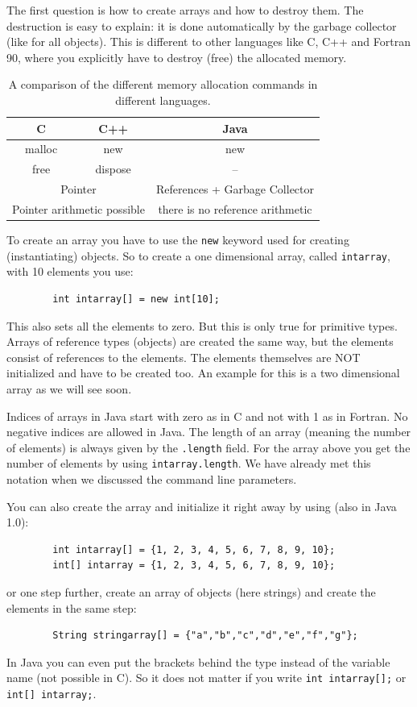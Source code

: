 The first question is how to create arrays and how to destroy them.
The destruction is easy to explain: it is done automatically
by the garbage collector (like for all objects). This is different to
other languages like C, C++ and Fortran 90, where you explicitly
have to destroy (free) the allocated memory. 
\begin{table}[htbp]
  \begin{center}
    \begin{tabular}{c|c|c}
      C & C++ & Java \\\hline
      malloc & new & new \\
      free & dispose & -- \\
      \multicolumn{2}{c}{Pointer} & References + Garbage Collector \\
      \multicolumn{2}{c}{Pointer arithmetic possible}& there is no 
                                                    reference arithmetic \\
    \end{tabular}
    \caption{A comparison of the different memory allocation commands in different languages.}
    \label{tab:MemoryAllocation}
  \end{center}
\end{table}
To create an array you have to use the \verb|new| keyword used for
creating (instantiating) objects. So to create a one dimensional
array, called \verb|intarray|, with 10 elements you use:
\begin{verbatim}
        int intarray[] = new int[10];
\end{verbatim}
This also sets all the elements to zero. But this is only true for 
primitive types. Arrays of reference types (objects) are created the
same way, but the elements consist of references to the elements. The
elements themselves are NOT initialized and have to be created too.
An example for this is a two dimensional array as we will see soon.

Indices of arrays in Java start with zero as in C and not with 1
as in Fortran. No negative indices are allowed in Java. The length
of an array (meaning the number of elements) is always given
by the \verb|.length| field. For the array above you get the number
of elements by using \verb|intarray.length|. We have already met
this notation when we discussed the command line parameters.

You can also create the array and initialize it right away by using
(also in Java 1.0):
\begin{verbatim}
        int intarray[] = {1, 2, 3, 4, 5, 6, 7, 8, 9, 10};
        int[] intarray = {1, 2, 3, 4, 5, 6, 7, 8, 9, 10};
\end{verbatim}
or one step further, create an array of objects (here strings) and
create the elements in the same step:
\begin{verbatim}
        String stringarray[] = {"a","b","c","d","e","f","g"};
\end{verbatim}
In Java you can even put the brackets behind the type instead of the
variable name (not possible in C). So it does not matter if you
write \verb|int intarray[];| or \verb|int[] intarray;|.

